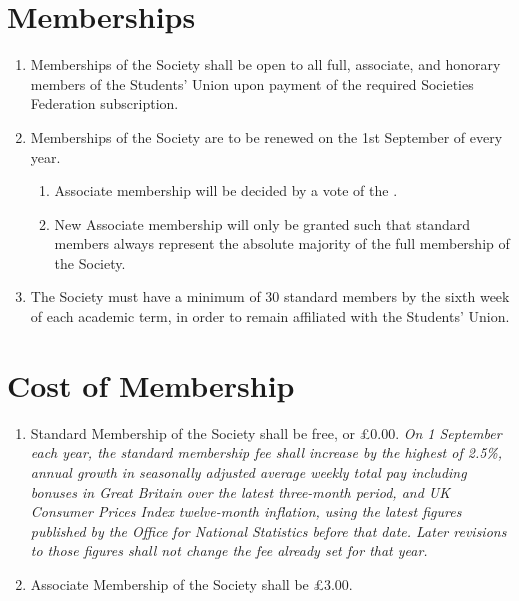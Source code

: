 \documentclass[a4paper,11pt,parskip=half-]{scrartcl} %
\begin{document}
\section{Memberships}
    \begin{enumerate}
        \item Memberships of the Society shall be open to all full, associate, and honorary members of the Students' Union upon payment of the required Societies Federation subscription.

        \item Memberships of the Society are to be renewed on the 1st September of every year.
            \begin{enumerate}
                \item Associate membership will be decided by a  vote of the \exec.

                \item New Associate membership will only be granted such that standard members always represent the absolute majority of the full membership of the Society.
            \end{enumerate}

        \item The Society must have a minimum of 30 standard members by the sixth week of each academic term, in order to remain affiliated with the Students' Union.
    \end{enumerate}

\section{Cost of Membership}
    \begin{enumerate}
        \item Standard Membership of the Society shall be free, or £0.00. \emph{On 1 September each year, the standard membership fee shall increase by the highest of 2.5\%, annual growth in seasonally adjusted average weekly total pay including bonuses in Great Britain over the latest three-month period, and UK Consumer Prices Index twelve-month inflation, using the latest figures published by the Office for National Statistics before that date. Later revisions to those figures shall not change the fee already set for that year.}

        \item Associate Membership of the Society shall be £3.00.
    \end{enumerate}
\end{document}
